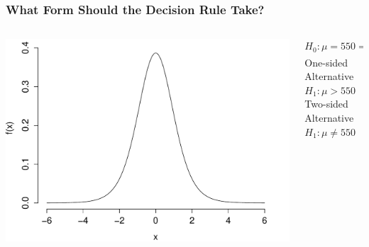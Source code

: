 \documentclass[handout]{beamer}
\begin{document}
\begin{frame}
\frametitle{What Form Should the Decision Rule Take?}
\begin{columns}
\begin{column}{6cm}
\includegraphics[scale = 0.5]{./images/t_pdf}
\end{column}

\begin{column}{6cm}
$H_0\colon \mu=550 \Rightarrow \displaystyle \frac{\bar{X} - 550}{S/3} \sim t(8)$\\ \pause
\vspace{1em}
One-sided Alternative $H_1\colon \mu > 550$\\ \pause
\vspace{1em}
Two-sided Alternative $H_1\colon \mu \neq 550$ 
\end{column}

\end{columns}
 
\end{frame}
\end{document}
